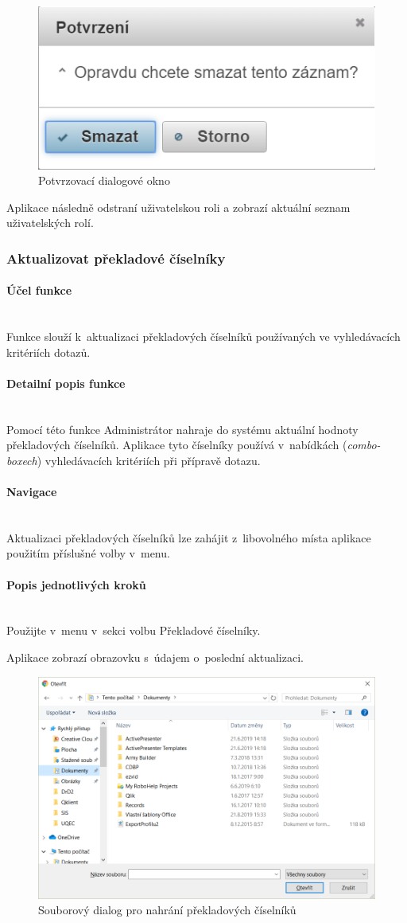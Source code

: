 \documentclass[thesis=M,czech]{FITthesis}[2019/12/23]
\newcommand{\lbparagraph}[1]{\paragraph{#1}\mbox{}\\} %
\newenvironment{reusefigure}[2][htbp]
  {\addtocounter{figure}{-1}%
   \renewcommand{\theHfigure}{dupe-fig}%
   \renewcommand{\thefigure}{\ref{#2}}%
   \renewcommand{\addcontentsline}[3]{}%
   \begin{figure}[#1]}
  {\end{figure}} %
\begin{document}
\begin{reusefigure}[H]{fig:Potvrzovací dialogové okno}
  \centering
  \includegraphics[scale=0.5]{res/guide/ConfirmationDialog.png}
  \caption{Potvrzovací dialogové okno}
\end{reusefigure}

Aplikace následně odstraní uživatelskou roli a zobrazí aktuální seznam uživatelských rolí.

\newpage
\subsubsection{Aktualizovat překladové číselníky}
\lbparagraph{Účel funkce}
Funkce slouží k~aktualizaci překladových číselníků používaných ve vyhledávacích kritériích dotazů.

\lbparagraph{Detailní popis funkce}
Pomocí této funkce Administrátor nahraje do systému aktuální hodnoty překladových číselníků. Aplikace tyto číselníky používá v~nabídkách (\textit{combo-boxech}) vyhledávacích kritériích při přípravě dotazu.

\lbparagraph{Navigace}
Aktualizaci překladových číselníků lze zahájit z~libovolného místa aplikace použitím příslušné volby v~menu.

\lbparagraph{Popis jednotlivých kroků}
Použijte v~menu v~sekci  volbu Překladové číselníky.

Aplikace zobrazí obrazovku s~údajem o~poslední aktualizaci.

\begin{figure}[H]
  \centering
  \includegraphics[width=\textwidth]{res/guide/TranslationDials.png}
  \caption{Souborový dialog pro nahrání překladových číselníků}
  \label{fig:Souborový dialog pro nahrání překladových číselníků}
\end{figure}
\end{document}
